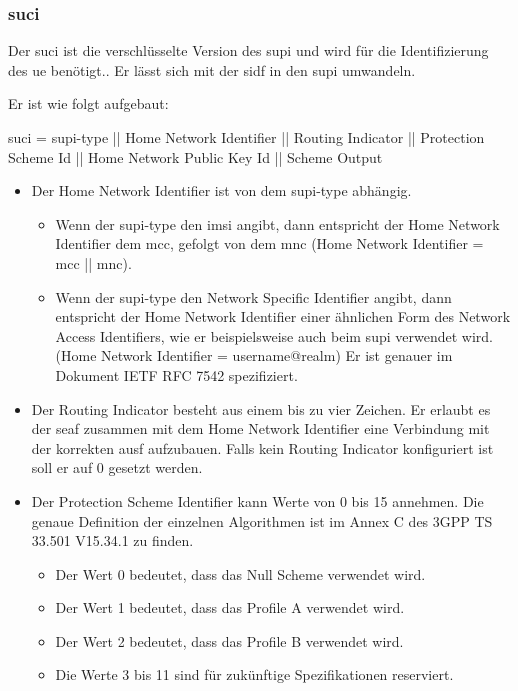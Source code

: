 \subsubsection{\gls{suci}}
Der \gls{suci} ist die verschlüsselte Version des \gls{supi} und wird für die Identifizierung des \gls{ue} benötigt..
Er lässt sich mit der \gls{sidf} in den \gls{supi} umwandeln.

Er ist wie folgt aufgebaut: %

\gls{suci} = \gls{supi-type} || Home Network Identifier || Routing Indicator || Protection Scheme Id || Home Network Public Key Id || Scheme Output

\begin{itemize}
\item Der Home Network Identifier ist von dem \gls{supi-type} abhängig.
\begin{itemize}
\item Wenn der \gls{supi-type} den \gls{imsi} angibt, dann entspricht der Home Network Identifier dem \gls{mcc}, gefolgt von dem \gls{mnc} (Home Network Identifier = \gls{mcc} || \gls{mnc}). 
\item Wenn der \gls{supi-type} den Network Specific Identifier angibt, dann entspricht der Home Network Identifier einer ähnlichen Form des Network Access Identifiers, wie er beispielsweise auch beim \gls{supi} verwendet wird. (Home Network Identifier = username@realm)
Er ist genauer im Dokument IETF RFC 7542 spezifiziert. %
\end{itemize}
\item Der Routing Indicator besteht aus einem bis zu vier Zeichen. %
Er erlaubt es der \gls{seaf} zusammen mit dem Home Network Identifier eine Verbindung mit der korrekten \gls{ausf} aufzubauen.
Falls kein Routing Indicator konfiguriert ist soll er auf 0 gesetzt werden.
\item Der Protection Scheme Identifier kann Werte von 0 bis 15 annehmen.
Die genaue Definition der einzelnen Algorithmen ist im Annex C des 3GPP TS 33.501 V15.34.1 zu finden. %
\begin{itemize}
\item Der Wert 0 bedeutet, dass das Null Scheme verwendet wird.
\item Der Wert 1 bedeutet, dass das Profile A verwendet wird.
\item Der Wert 2 bedeutet, dass das Profile B verwendet wird.
\item Die Werte 3 bis 11 sind für zukünftige Spezifikationen reserviert.

\end{itemize}
\end{itemize}
